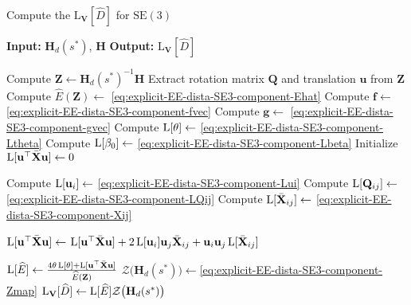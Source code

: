 \begin{algorithm}[H]
    \caption{Compute the $\text{L}_\mathbf{V}[\widehat{D}]$ for $\text{SE}(3)$}
    \begin{algorithmic}[1]
    \Statex \textbf{Input:} $\mathbf{H}_d(s^*)$, $\mathbf{H}$
    \Statex \textbf{Output:} $\text{L}_\mathbf{V}[\widehat{D}]$ 
    
    \State Compute $\mathbf{Z} \gets \mathbf{H}_d(s^*)^{-1} \mathbf{H}$
    \State Extract rotation matrix $\mathbf{Q}$ and translation $\mathbf{u}$ from $\mathbf{Z}$
    \State Compute $\widehat{E}(\mathbf{Z}) \gets$  \eqref{eq:explicit-EE-dista-SE3-component-Ehat}
    \State Compute $\mathbf{f} \gets$ \eqref{eq:explicit-EE-dista-SE3-component-fvec}
    \State Compute $\mathbf{g} \gets$ \eqref{eq:explicit-EE-dista-SE3-component-gvec}
    \State Compute $\operatorname{L}[\theta] \gets$ \eqref{eq:explicit-EE-dista-SE3-component-Ltheta}
    \State Compute $\operatorname{L}[\beta_0] \gets$ \eqref{eq:explicit-EE-dista-SE3-component-Lbeta}
    \State Initialize $\operatorname{L}[\mathbf{u}^\top \bar{\mathbf{X}} \mathbf{u}] \gets 0$ 

        \State Compute $\operatorname{L}[\mathbf{u}_i] \gets$ \eqref{eq:explicit-EE-dista-SE3-component-Lui}
            \State Compute $\operatorname{L}[\mathbf{Q}_{ij}] \gets$ \eqref{eq:explicit-EE-dista-SE3-component-LQij}
            \State Compute $\operatorname{L}[\bar{\mathbf{X}}_{ij}]\gets$ \eqref{eq:explicit-EE-dista-SE3-component-Xij}
        
            \State $\operatorname{L}[\mathbf{u}^\top \bar{\mathbf{X}} \mathbf{u}] \gets$ $\operatorname{L}[\mathbf{u}^\top \bar{\mathbf{X}} \mathbf{u}]
            + 2\operatorname{L}[\mathbf{u}_i]\mathbf{u}_j \bar{\mathbf{X}}_{ij} 
            + \mathbf{u}_i \mathbf{u}_j \operatorname{L}[\bar{\mathbf{X}}_{ij}]
            $
        \EndFor
    \EndFor
    
    \State $\operatorname{L}[\widehat{E}] \gets \frac{4\theta\operatorname{L}[\theta] + \operatorname{L}[\mathbf{u}^\top \bar{\mathbf{X}} \mathbf{u}]}{\widehat{E}(\mathbf{Z})}$
    \State $\mathcal{Z}\bigl(\mathbf{H}_d(s^*)\bigr) \gets$\eqref{eq:explicit-EE-dista-SE3-component-Zmap}
    \State $\operatorname{L}_\mathbf{V}[\widehat{D}] \gets \operatorname{L}[\widehat{E}]\mathcal{Z}\bigl(\mathbf{H}_d(s^*)\bigr)$
    \end{algorithmic}
\end{algorithm}





